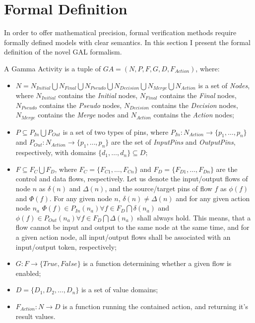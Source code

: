 \clearpage\section{Formal Definition}


In order to offer mathematical precision, formal verification methods require formally defined models with clear semantics. In this section I present the formal definition of the novel GAL formalism.

\begin{definition}
	A Gamma Activity is a tuple of \(GA = (N, P, F, G, D, F_{Action})\), where:
	
	\begin{itemize}
		\item \(N = N_\mathit{Initial} \bigcup N_\mathit{Final} \bigcup N_\mathit{Pseudo} \bigcup N_\mathit{Decision} \bigcup N_\mathit{Merge} \bigcup N_\mathit{Action} \) is a set of \emph{Nodes}, where \(N_\mathit{Initial}\) contains the \emph{Initial} nodes, \(N_\mathit{Final}\) contains the \emph{Final} nodes, \(N_\mathit{Pseudo}\) contains the \emph{Pseudo} nodes, \(N_\mathit{Decision}\) contains the \emph{Decision} nodes, \(N_\mathit{Merge}\) contains the \emph{Merge} nodes and \(N_\mathit{Action}\) contains the \emph{Action} nodes;
		\item \( P \subseteq P_\mathit{In} \bigcup P_\mathit{Out} \) is a set of two types of pins, where \(P_\mathit{In} : N_\mathit{Action} \rightarrow \{ p_1, \dots, p_n \} \) and \(P_\mathit{Out} : N_\mathit{Action} \rightarrow \{ p_1, \dots, p_n \} \) are the set of \emph{InputPins} and \emph{OutputPins}, respectively, with domains \(\{ d_1, \dots, d_n \} \subseteq D \);
		\item \( F \subseteq F_C \bigcup F_D \), where \(F_C = \{ F_{C1}, \dots, F_{Cn} \} \) and \(F_D = \{ F_{D1}, \dots, F_{Dn} \} \) are the control and data flows, respectively. Let us denote the input/output flows of node \(n\) as \( \delta(n) \) and \( \Delta(n) \), and the source/target pins of flow \(f\) as \(\phi(f)\) and \(\Phi(f)\). For any given node \(n\), \( \delta(n) \neq \Delta(n) \) and for any given action node \(n_a\) \( \Phi(f) \in P_\mathit{In}(n_a) \forall f \in F_D \bigcap \delta(n_a) \) and \( \phi(f) \in P_\mathit{Out}(n_a) \forall f \in F_D \bigcap \Delta(n_a) \) shall always hold. This means, that a flow cannot be input and output to the same node at the same time, and for a given action node, all input/output flows shall be associated with an input/output token, respectively;
		\item \(G : F \rightarrow \{ \mathit{True}, \mathit{False} \} \) is a function determining whether a given flow is enabled;
		\item \(D = \{ D_{1}, D_{2}, \dots, D_{n} \} \) is a set of value domains;
		\item \(F_{Action} : N \rightarrow D \) is a function running the contained action, and returning it's result values.
	\end{itemize}
	

\end{definition}
